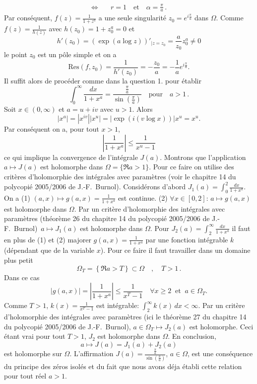 {\begin{enumerate}
{$$\begin{aligned}
\Longleftrightarrow\quad & r=1 \quad \text{et} \quad \alpha =\frac{\pi}{a}\, .
\end{aligned}$$
Par cons\'equent, $f(z)=\frac{1}{1+z^a}$ a une seule singularit\'e $z_0= e^{i\frac{\pi}{a}}$ dans $\Omega$.
Comme $f(z)=\frac{1}{h(z)}$ avec $h(z_0)=1+z_0^a =0$ et
$$h'(z_0)=\left(  \exp (a\log z)\right)'_{|z=z_0}=\frac{a}{z_0}z_0^a \neq 0$$
le point $z_0$ est un p\^ole simple et on a
$$\mathrm{Res} (f,z_0) =\frac{1}{h'(z_0)} =-\frac{z_0}{a} = -\frac{1}{a} e^{i\frac{\pi}{a}}.$$
Il suffit alors de proc\'eder comme dans la question 1. pour \'etablir
$$\int_0^\infty \frac{dx}{1+x^a}=\frac{\frac{\pi}{a}}{\sin\left(\frac{\pi}{a}\right)} \quad \text{pour} \quad a>1\, .$$
Soit $x\in(0,\infty )$ et $a=u+iv$ avec $u>1$. Alors
$$|x^a|=|x^{iv}||x^u|=|\exp \left( i(v\log x)\right)|x^u =x^u.$$
Par cons\'equent on a, pour tout $x>1$,
$$\left| \frac{1}{1+x^a}\right|\leq  \frac{1}{x^u-1}$$
ce qui implique la convergence de l'int\'egrale $J(a)$.
Montrons que l'application $a\mapsto J(a)$ est holomorphe dans $\Omega=\{ \Re a >1\}$.
Pour ce faire on utilise des critères d'holomorphie des intégrales avec paramètres (voir le chapitre 14 du polycopi\'e 2005/2006 de J.-F.~Burnol).
Consid\'erons d'abord
$J_1(a)=\int_0^2 \frac{dx}{1+x^a}$. On a
(1) $(a,x)\mapsto g(a,x)=\frac{1}{1+x^a}$ est continue.
(2) $\forall x\in [0,2]$: $a\mapsto g(a,x)$ est holomorphe dans $\Omega$.
\noindent Par un critère d'holomorphie des intégrales avec paramètres  (th\'eor\`eme 26 du chapitre 14 du polycopi\'e 2005/2006 de J.-F.~Burnol)\, $a\mapsto J_1(a)$ est holomorphe dans $\Omega$.
Pour $J_2(a)=\int_2^\infty \frac{dx}{1+x^a}$ il faut en plus de (1) et (2) majorer
$g(a,x)=\frac{1}{1+x^a}$ par une fonction int\'egrable $k$ (d\'ependant que de la variable $x$).
Pour ce faire il faut travailler dans un domaine plus petit
$$\Omega_T =\left\{ \Re a>T\right\} \subset \Omega \quad , \quad T>1\, .$$
Dans ce cas
$$|g(a,x)| = \left| \frac{1}{1+x^a} \right| \leq \frac{1}{x^T-1} \quad \forall x\geq 2 \;\; \text{et} \;\; a\in \Omega _T.$$
Comme $T>1$, $k(x)=\frac{1}{x^T-1}$ est int\'egrable: $\int _2^\infty k(x)\, dx <\infty$.
Par un critère d'holomorphie des intégrales avec paramètres (ici le th\'eor\`eme 27 du chapitre 14 du polycopi\'e 2005/2006 de J.-F.~Burnol), $a\in \Omega_T \mapsto J_2(a)$ est holomorphe.
Ceci \'etant vrai pour tout $T>1$, $J_2$ est holomorphe dans $\Omega$. En conclusion,
$$a \mapsto J(a)=J_1(a)+J_2(a)$$
est holomorphe sur $\Omega$.
L'affirmation $J(a)= \frac{\frac{\pi}{a}}{\sin\left(\frac{\pi}{a}\right)}$, $a\in \Omega$, est une cons\'equence
du principe des z\'eros isol\'es et du fait que nous avons d\'eja \'etabli cette relation pour tout r\'eel $a>1$.
}
\end{enumerate}}
